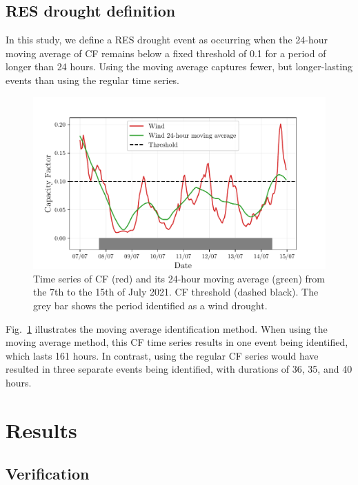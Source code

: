 \documentclass[a4paper, 11pt]{article}
\begin{document}
\subsection{RES drought definition}
\label{sec:res_drought}

In this study, we define a RES drought event as occurring when the 24-hour moving average of CF remains below a fixed threshold of 0.1 for a period of longer than 24 hours. Using the moving average captures fewer, but longer-lasting events than using the regular time series.

\begin{figure}[ht!]
	\centering
	\includegraphics[width=\textwidth]{data_methods/find_res_droughts}
	\caption{Time series of CF (red) and its 24-hour moving average (green) from the 7th to the 15th of July 2021. CF threshold (dashed black). The grey bar shows the period identified as a wind drought.}
	\label{fig:find_res_droughts}
\end{figure}

Fig.~\ref{fig:find_res_droughts} illustrates the moving average  identification method. When using the moving average method, this CF time series results in one event being identified, which lasts 161 hours. In contrast, using the regular CF series would have resulted in three separate events being identified, with durations of 36, 35, and 40 hours.

\section{Results}
\label{sec:results}

\subsection{Verification}
\label{sec:verification}
\end{document}
